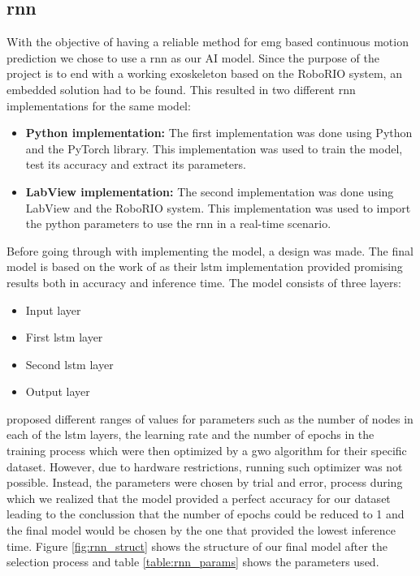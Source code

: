 \subsection{\acrfull{rnn}}
With the objective of having a reliable method for \acrshort{emg} based continuous motion prediction we chose to use a \acrshort{rnn} as our AI model.
Since the purpose of the project is to end with a working exoskeleton based on the RoboRIO system, an embedded solution had to be found. This resulted
in two different \acrshort{rnn} implementations for the same model:
\begin{itemize}

    \item \textbf{Python implementation:} The first implementation was done using Python and the PyTorch library. This implementation was used to train the model, test its accuracy and extract its parameters.
    
    \item \textbf{LabView implementation:} The second implementation was done using LabView and the RoboRIO system. This implementation was used to import the python parameters to use the \acrshort{rnn} in a real-time scenario.

\end{itemize}

Before going through with implementing the model, a design was made. The final model is based on the work of \cite{RNNEMG} as their \acrfull{lstm} implementation provided promising results both in accuracy and
inference time. The model consists of three layers:
\begin{itemize}

    \item Input layer

    \item First \acrshort{lstm} layer

    \item Second \acrshort{lstm} layer
    
    \item Output layer

\end{itemize}

\cite{RNNEMG} proposed different ranges of values for parameters such as the number of nodes in each of the \acrshort{lstm} layers, the learning rate and the number of epochs in the training process
which were then optimized by a \acrfull{gwo} algorithm for their specific dataset. However, due to hardware restrictions, running such optimizer was not possible. Instead, the parameters were
chosen by trial and error, process during which we realized that the model provided a perfect accuracy for our dataset leading to the conclussion that the number of epochs could be reduced to 1 and
the final model would be chosen by the one that provided the lowest inference time. Figure \ref{fig:rnn_struct} shows the structure of our final model after the selection process and table \ref{table:rnn_params} shows the parameters used.

